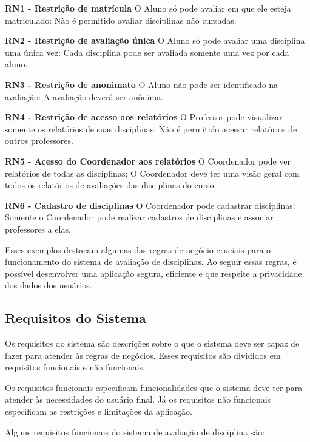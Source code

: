 \begin{alineas}
  \item \textbf{RN1 - Restrição de matrícula} O Aluno só pode avaliar em que ele esteja matriculado: Não é permitido avaliar disciplinas não cursadas.
  \item \textbf{RN2 - Restrição de avaliação única} O Aluno só pode avaliar uma disciplina uma única vez: Cada disciplina pode ser avaliada somente uma vez por cada aluno.
  \item \textbf{RN3 - Restrição de anonimato} O Aluno não pode ser identificado na avaliação: A avaliação deverá ser anônima.
  \item \textbf{RN4 - Restrição de acesso aos relatórios} O Professor pode visualizar somente os relatórios de suas disciplinas: Não é permitido acessar relatórios de outros professores.
  \item \textbf{RN5 - Acesso do Coordenador aos relatórios} O Coordenador pode ver relatórios de todas as disciplinas: O Coordenador deve ter uma visão geral com todos os relatórios de avaliações das disciplinas do curso.
  \item \textbf{RN6 - Cadastro de disciplinas} O Coordenador pode cadastrar disciplinas: Somente o Coordenador pode realizar cadastros de disciplinas e associar professores a elas.
\end{alineas}

Esses exemplos destacam algumas das regras de negócio cruciais para o funcionamento do sistema de avaliação de disciplinas. Ao seguir essas regras, é possível desenvolver uma aplicação segura, eficiente e que respeite a privacidade dos dados dos usuários.

\subsection{Requisitos do Sistema}
Os requisitos do sistema são descrições sobre o que o sistema deve ser capaz de fazer para atender às regras de negócios. Esses requisitos são divididos em requisitos funcionais e não funcionais. 

Os requisitos funcionais especificam funcionalidades que o sistema deve ter para atender às necessidades do usuário final. Já os requisitos não funcionais especificam as restrições e limitações da aplicação.

Alguns requisitos funcionais do sistema de avaliação de disciplina são:


